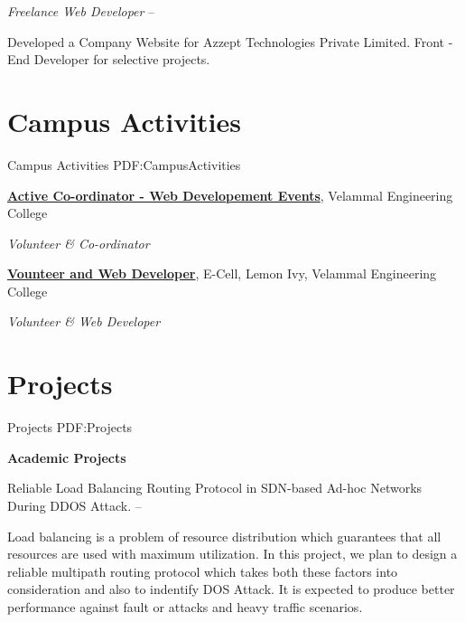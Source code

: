 \documentclass[letterpaper,MMMyyyy,nonstop]{simpleresumecv}
\begin{document}
\begin{body}
\newline

\GapNoBreak
\BulletItem
\emph {Freelance Web Developer}
\hfill
{} -- 

\begin{detail}
\SubBulletItem
Developed a Company Website for Azzept Technologies Private Limited.
\SubBulletItem
Front - End Developer for selective projects.
\end{detail}


\section
{Campus Activities}
{Campus Activities}
{PDF:CampusActivities}

\href{\#}
{\textbf{Active Co-ordinator - Web Developement Events}},
Velammal Engineering College

\GapNoBreak
\BulletItem
\emph{Volunteer \& Co-ordinator}
\hfill
{}

\BigGap
\href{\#}
{\textbf{Vounteer and Web Developer}},
E-Cell, Lemon Ivy, Velammal Engineering College

\GapNoBreak
\BulletItem
\emph{Volunteer \& Web Developer } 
\hfill
{}


\section
{Projects}
{Projects}
{PDF:Projects}

{\textbf{Academic Projects}}

\GapNoBreak
\BulletItem
Reliable Load Balancing Routing Protocol in SDN-based \newline Ad-hoc Networks During DDOS Attack.
\hfill
{} --
\begin{detail}
\SubBulletItem
Load balancing is a problem of resource distribution which guarantees that all resources are used with maximum utilization. 
In this project, we plan to design a reliable multipath routing protocol which takes both these factors into consideration and also to indentify DOS Attack. 
It is expected to produce better performance against fault or attacks and heavy traffic scenarios.
\end{detail}


\end{body}
\end{document}
